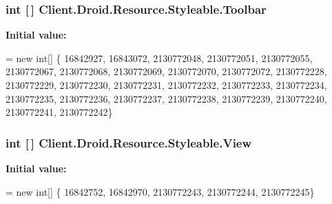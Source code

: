 \subsubsection[{Toolbar}]{\setlength{\rightskip}{0pt plus 5cm}int \mbox{[}$\,$\mbox{]} Client.\+Droid.\+Resource.\+Styleable.\+Toolbar\hspace{0.3cm}{\ttfamily [static]}}\label{classClient_1_1Droid_1_1Resource_1_1Styleable_a62471d53a203d054bba27142b29fa08e}
{\bfseries Initial value\+:}
\begin{DoxyCode}
= \textcolor{keyword}{new} \textcolor{keywordtype}{int}[]
            \{
                    16842927,
                    16843072,
                    2130772048,
                    2130772051,
                    2130772055,
                    2130772067,
                    2130772068,
                    2130772069,
                    2130772070,
                    2130772072,
                    2130772228,
                    2130772229,
                    2130772230,
                    2130772231,
                    2130772232,
                    2130772233,
                    2130772234,
                    2130772235,
                    2130772236,
                    2130772237,
                    2130772238,
                    2130772239,
                    2130772240,
                    2130772241,
                    2130772242\}
\end{DoxyCode}
\hypertarget{classClient_1_1Droid_1_1Resource_1_1Styleable_a252d4c4a95dd0501f2842686c281a51d}{}
\subsubsection[{View}]{\setlength{\rightskip}{0pt plus 5cm}int \mbox{[}$\,$\mbox{]} Client.\+Droid.\+Resource.\+Styleable.\+View\hspace{0.3cm}{\ttfamily [static]}}\label{classClient_1_1Droid_1_1Resource_1_1Styleable_a252d4c4a95dd0501f2842686c281a51d}
{\bfseries Initial value\+:}
\begin{DoxyCode}
= \textcolor{keyword}{new} \textcolor{keywordtype}{int}[]
            \{
                    16842752,
                    16842970,
                    2130772243,
                    2130772244,
                    2130772245\}
\end{DoxyCode}
\hypertarget{classClient_1_1Droid_1_1Resource_1_1Styleable_a9f5a8ce2f84307f25fae90ff1b8aa4a7}{}
